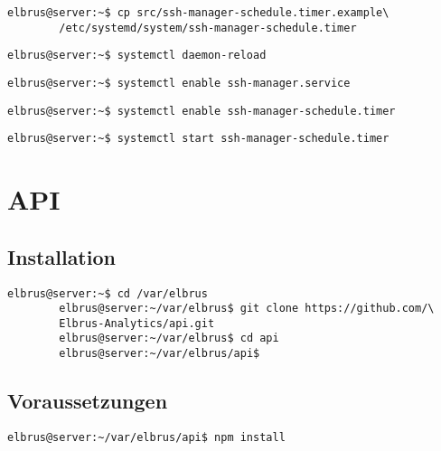 \documentclass{article}
\begin{document}
	\begin{lstlisting}[caption={Kopieren des Zeitplanungsprogrammes.}]
		elbrus@server:~$ cp src/ssh-manager-schedule.timer.example\
		/etc/systemd/system/ssh-manager-schedule.timer
	\end{lstlisting}

	\begin{lstlisting}[caption={Neuladen des 'systemctl' Deamons.}]
		elbrus@server:~$ systemctl daemon-reload
	\end{lstlisting}

	\begin{lstlisting}[caption={Aktivieren des Serviceprogrammes.}]
		elbrus@server:~$ systemctl enable ssh-manager.service
	\end{lstlisting}

	\begin{lstlisting}[caption={Aktivieren des Zeitplanungsprogrammes.}]
		elbrus@server:~$ systemctl enable ssh-manager-schedule.timer
	\end{lstlisting}

	\begin{lstlisting}[caption={Starten des Zeitplanungsprogrammes.}]
		elbrus@server:~$ systemctl start ssh-manager-schedule.timer
	\end{lstlisting}
	\newpage
	
	\section{API}
	\lstset{style=commands}
	\subsection{Installation}
	\begin{lstlisting}[caption={Clonen der Software von GitHub.}]
		elbrus@server:~$ cd /var/elbrus
		elbrus@server:~/var/elbrus$ git clone https://github.com/\
		Elbrus-Analytics/api.git
		elbrus@server:~/var/elbrus$ cd api
		elbrus@server:~/var/elbrus/api$
	\end{lstlisting}

	\subsection{Voraussetzungen}
	\begin{lstlisting}[caption={Nachinstallieren der Abhängigkeiten.}]
		elbrus@server:~/var/elbrus/api$ npm install
	\end{lstlisting}
\end{document}
